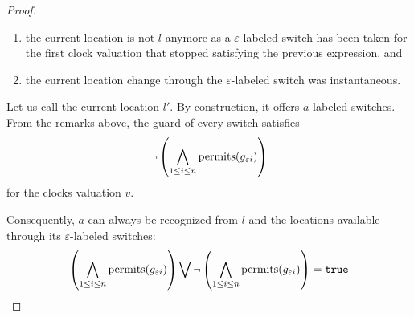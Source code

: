 \begin{proof}
\begin{enumerate}
  \item the current location is not $l$ anymore as a $\varepsilon$-labeled switch has been taken for the first clock valuation that stopped satisfying the previous expression, and
  
  \item the current location change through the $\varepsilon$-labeled switch was instantaneous.
  
\end{enumerate}
Let us call the current location $l'$. By construction, it offers $a$-labeled switches. From the remarks above, the guard of every switch satisfies 
$$ \neg \left( \bigwedge\limits_{1 \leq i \leq n} \operatorname{permits}(g_{\varepsilon i}) \right)$$
for the clocks valuation $v$.

Consequently, $a$ can always be recognized from $l$ and the locations available through its $\varepsilon$-labeled switches:
$$
  \left( \bigwedge\limits_{1 \leq i \leq n} \operatorname{permits}(g_{\varepsilon i}) \right)
  \bigvee
  \neg \left( \bigwedge\limits_{1 \leq i \leq n} \operatorname{permits}(g_{\varepsilon i}) \right)
  = \mathtt{true}
$$
\label{proof:closure-complement}
\end{proof}

